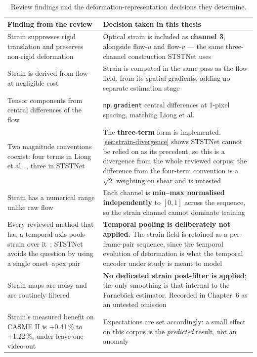 \begin{table}[htbp]
	\centering
	\footnotesize
	\begin{tabular}{p{6.0cm} p{6.5cm}}
		\hline
		\textbf{Finding from the review} & \textbf{Decision taken in this thesis} \\
		\hline
		Strain suppresses rigid translation and preserves non-rigid deformation~\cite{shreve2011} & Optical strain is included as \textbf{channel 3}, alongside flow-$u$ and flow-$v$ --- the same three-channel construction STSTNet uses~\cite{liong2019b} \\
		Strain is derived from flow at negligible cost~\cite{shreve2011} & Strain is computed in the same pass as the flow field, from its spatial gradients, adding no separate estimation stage \\
		Tensor components from central differences of the flow~\cite{shreve2011,liong2014a} & \texttt{np.gradient} central differences at 1-pixel spacing, matching Liong et al.~\cite{liong2014a} \\
		Two magnitude conventions coexist: four terms in Liong et al.~\cite{liong2014a,liong2014b,liong2016}, three in STSTNet~\cite{liong2019b} & The \textbf{three-term} form is implemented. \autoref{sec:strain-divergence} shows STSTNet cannot be relied on as its precedent, so this is a divergence from the whole reviewed corpus; the difference from the four-term convention is a $\sqrt{2}$ weighting on shear and is untested \\
		Strain has a numerical range unlike raw flow & Each channel is \textbf{min--max normalised independently} to $[0,1]$ across the sequence, so the strain channel cannot dominate training \\
		Every reviewed method that has a temporal axis pools strain over it~\cite{liong2014a,liong2014b,liong2016}; STSTNet~\cite{liong2019b} avoids the question by using a single onset--apex pair & \textbf{Temporal pooling is deliberately not applied.} The strain field is retained as a per-frame-pair sequence, since the temporal evolution of deformation is what the temporal encoder under study is meant to model \\
		Strain maps are noisy and are routinely filtered~\cite{liong2014a,liong2016} & \textbf{No dedicated strain post-filter is applied}; the only smoothing is that internal to the Farneb\"ack estimator. Recorded in Chapter~6 as an untested omission \\
		Strain's measured benefit on CASME II is +0.41\,\% to +1.22\,\%, under leave-one-video-out~\cite{liong2016} & Expectations are set accordingly: a small effect on this corpus is the \textit{predicted} result, not an anomaly \\
		\hline
	\end{tabular}
	\caption[Review findings and the deformation-representation decisions they determine]{Review findings and the deformation-representation decisions they determine.}
	\label{tab:strain-decisions}
\end{table}

